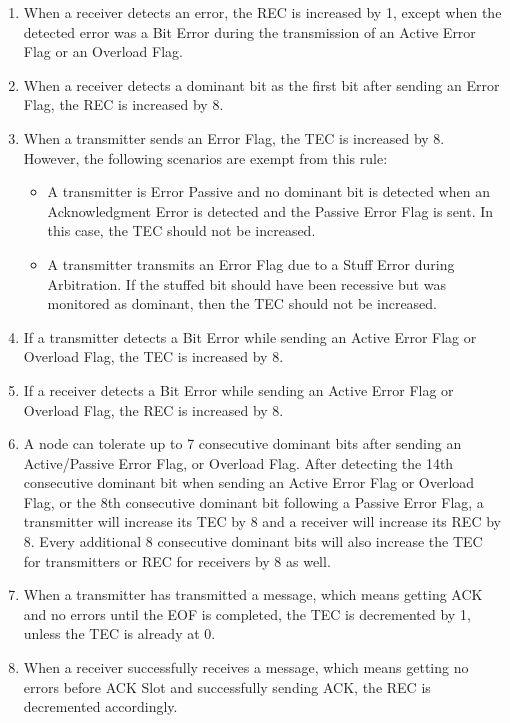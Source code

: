 \documentclass[main\_\_EN.tex]{subfiles}
\begin{document}
\begin{enumerate}
    \item When a receiver detects an error, the REC is increased by 1, except when the detected error was a Bit Error during the transmission of an Active Error Flag or an Overload Flag.
    \item When a receiver detects a dominant bit as the first bit after sending an Error Flag, the REC is increased by 8.
    \item When a transmitter sends an Error Flag, the TEC is increased by 8. However, the following scenarios are exempt from this rule:
    \begin{itemize}
        \item A transmitter is Error Passive and no dominant bit is detected when an Acknowledgment Error is detected and the Passive Error Flag is sent. In this case, the TEC should not be increased.
        \item A transmitter transmits an Error Flag due to a Stuff Error during Arbitration. If the stuffed bit should have been recessive but was monitored as dominant, then the TEC should not be increased.
    \end{itemize}
    \item If a transmitter detects a Bit Error while sending an Active Error Flag or Overload Flag, the TEC is increased by 8.
    \item If a receiver detects a Bit Error while sending an Active Error Flag or Overload Flag, the REC is increased by 8.
    \item A node can tolerate up to 7 consecutive dominant bits after sending an Active/Passive Error Flag, or Overload Flag. After detecting the 14th consecutive dominant bit when sending an Active Error Flag or Overload Flag, or the 8th consecutive dominant bit following a Passive Error Flag, a transmitter will increase its TEC by 8 and a receiver will increase its REC by 8. Every additional 8 consecutive dominant bits will also increase the TEC for transmitters or REC for receivers by 8 as well.
    \item When a transmitter has transmitted a message, which means getting ACK and no errors until the EOF is completed, the TEC is decremented by 1, unless the TEC is already at 0.
    \item When a receiver successfully receives a message, which means getting no errors before ACK Slot and successfully sending ACK, the REC is decremented accordingly.
    \begin{itemize}

\end{itemize}
\end{enumerate}
\end{document}
